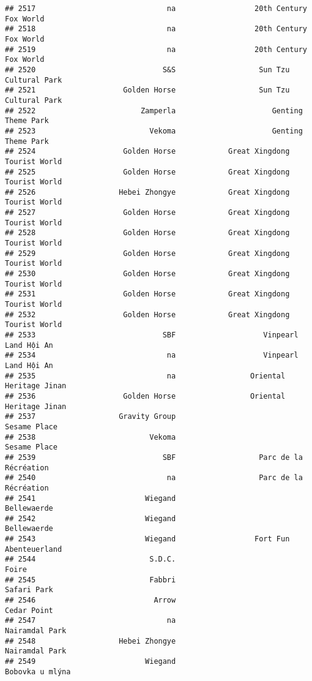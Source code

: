 \documentclass[
]{article}
\begin{document}
\begin{verbatim}
## 2517                              na                  20th Century Fox World
## 2518                              na                  20th Century Fox World
## 2519                              na                  20th Century Fox World
## 2520                             S&S                   Sun Tzu Cultural Park
## 2521                    Golden Horse                   Sun Tzu Cultural Park
## 2522                        Zamperla                      Genting Theme Park
## 2523                          Vekoma                      Genting Theme Park
## 2524                    Golden Horse            Great Xingdong Tourist World
## 2525                    Golden Horse            Great Xingdong Tourist World
## 2526                   Hebei Zhongye            Great Xingdong Tourist World
## 2527                    Golden Horse            Great Xingdong Tourist World
## 2528                    Golden Horse            Great Xingdong Tourist World
## 2529                    Golden Horse            Great Xingdong Tourist World
## 2530                    Golden Horse            Great Xingdong Tourist World
## 2531                    Golden Horse            Great Xingdong Tourist World
## 2532                    Golden Horse            Great Xingdong Tourist World
## 2533                             SBF                    Vinpearl Land Hội An
## 2534                              na                    Vinpearl Land Hội An
## 2535                              na                 Oriental Heritage Jinan
## 2536                    Golden Horse                 Oriental Heritage Jinan
## 2537                   Gravity Group                            Sesame Place
## 2538                          Vekoma                            Sesame Place
## 2539                             SBF                   Parc de la Récréation
## 2540                              na                   Parc de la Récréation
## 2541                         Wiegand                             Bellewaerde
## 2542                         Wiegand                             Bellewaerde
## 2543                         Wiegand                  Fort Fun Abenteuerland
## 2544                          S.D.C.                                   Foire
## 2545                          Fabbri                             Safari Park
## 2546                           Arrow                             Cedar Point
## 2547                              na                          Nairamdal Park
## 2548                   Hebei Zhongye                          Nairamdal Park
## 2549                         Wiegand                         Bobovka u mlýna

\end{verbatim}
\end{document}
